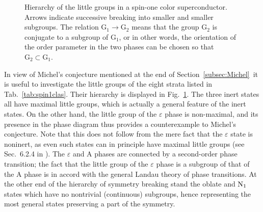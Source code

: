 \documentclass[final,2p,times,12pt,sort&compress]{elsarticle}
\newcommand\gr[1]{\mathrm{#1}}              %
\newcommand\ve{\varepsilon}
\begin{document}
\begin{figure}
\begin{center}
\end{center}
\caption{Hierarchy of the little groups in a spin-one color superconductor.
Arrows indicate successive breaking into smaller and smaller subgroups.
The relation $\gr{G_1\to G_2}$ means that the group $\gr{G_2}$ is conjugate to
a subgroup of $\gr{G_1}$, or in other words, the orientation of the order
parameter in the two phases can be chosen so that $\gr{G_2}\subset\gr{G_1}$.}
\label{fig:spin1scheme}
\end{figure}
In view of Michel's conjecture mentioned at the end of
Section~\ref{subsec:Michel}\ it is useful to investigate the little groups of
the eight strata listed in Tab.~\ref{tab:spin1clas}. Their hierarchy is
displayed in Fig.~\ref{fig:spin1scheme}. The three inert states all have
maximal little groups, which is actually a general feature of the inert states.
On the other hand, the little group of the $\ve$ phase is non-maximal, and its
presence in the phase diagram thus provides a counterexample to Michel's
conjecture. Note that this does not follow from the mere fact that the $\ve$
state is noninert, as even such states can in principle have maximal little
groups (see Sec.~6.2.4 in \cite{Vollhardt:1990vw}). The $\ve$ and A phases are
connected by a second-order phase transition; the fact that the little group of
the $\ve$ phase is a subgroup of that of the A phase is in accord with the
general Landau theory of phase transitions. At the other end of the hierarchy of
symmetry breaking stand the oblate and $\text N_1$ states which have no
nontrivial (continuous) subgroups, hence representing the most general states
preserving a part of the symmetry.

\end{document}
